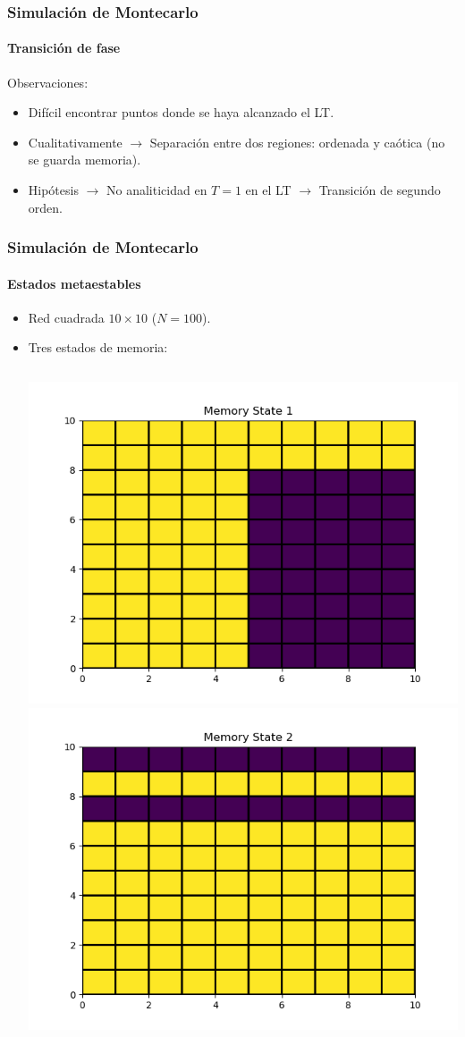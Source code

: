 \documentclass[11pt]{beamer}
\begin{document}
\begin{frame}
\frametitle{Simulación de Montecarlo}
\framesubtitle{Transición de fase}
Observaciones:
\begin{itemize}
\item Difícil encontrar puntos donde se haya alcanzado el LT.
\item Cualitativamente $\longrightarrow$ Separación entre dos regiones: ordenada y caótica (no se guarda memoria).
\item Hipótesis $\longrightarrow$ No analiticidad en $T = 1$ en el LT $\longrightarrow$ Transición de segundo orden.
\end{itemize}
\end{frame}

\begin{frame}
\frametitle{Simulación de Montecarlo}
\framesubtitle{Estados metaestables}
\begin{itemize}
\item Red cuadrada $10 \times 10$ ($N = 100$).
\item Tres estados de memoria:
\begin{columns}
\includegraphics[width=\linewidth]{state_10x10_1.png}
\includegraphics[width=\linewidth]{state_10x10_2.png}

\end{columns}
\end{itemize}
\end{frame}
\end{document}
